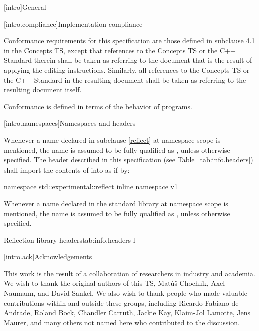 
[intro]{General}

[intro.compliance]{Implementation compliance}

\pnum
Conformance requirements for this specification are those defined in subclause
4.1 in the Concepts TS, except that references to the Concepts TS or the C++
Standard therein shall be taken as referring to the document that is the result
of applying the editing instructions. Similarly, all references to the Concepts
TS or the C++ Standard in the resulting document shall be taken as referring to
the resulting document itself.
\begin{note}
Conformance is defined in terms of the behavior of programs.
\end{note}

[intro.namespaces]{Namespaces and headers}

\pnum
Whenever a name  declared in subclause \ref{reflect} at namespace scope
is mentioned, the name  is assumed to be fully qualified as
, unless otherwise specified.
The header described in this specification (see Table~\ref{tab:info.headers})
shall import the contents of  into
 as if by:

\begin{codeblock}
namespace std::experimental::reflect {
  inline namespace v1 {}
}
\end{codeblock}

\pnum
Whenever a name  declared in the standard library at namespace scope is
mentioned, the name  is assumed to be fully qualified as
, unless otherwise specified.

\begin{floattable}{Reflection library headers}{tab:info.headers}
{l}
\topline
{} \\
\end{floattable}

[intro.ack]{Acknowledgements}

\pnum
This work is the result of a collaboration of researchers in industry and
academia.  We wish to thank the original authors of this TS, Mat\'{u}\v{s}
Chochl\'{i}k, Axel Naumann, and David Sankel. We also wish to thank people who
made valuable contributions within and outside these groups, including Ricardo
Fabiano de Andrade, Roland Bock, Chandler Carruth, Jackie Kay, Klaim-Jol
Lamotte, Jens Maurer, and many others not named here who contributed to the
discussion.
